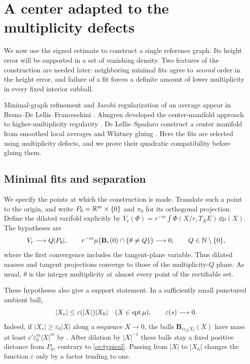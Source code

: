 \section{A center adapted to the multiplicity defects}
\label{sec:centering}

We now use the signed estimate to construct a single reference graph.  Its
height error will be supported in a set of vanishing density.  Two features
of the construction are needed later: neighboring minimal fits agree to
\emph{second} order in the height error, and failure of a fit forces a
definite amount of lower multiplicity in every fixed interior subball.

Minimal-graph refinement and Jacobi regularization of an average appear in
Brena--De Lellis--Franceschini \cite[Sections~2 and~6.3--6.4]{BDLF2025}.
Almgren developed the center-manifold approach to higher-multiplicity
regularity \cite{Almgren2000}. De Lellis--Spadaro construct a center
manifold from smoothed local averages and Whitney gluing
\cite[Sections~1 and~4]{DLS2016II}. Here the fits are selected using
multiplicity defects, and we prove their quadratic compatibility before
gluing them.

\subsection{Minimal fits and separation}

We specify the points at which the construction is made.  Translate such a
point to the origin, and write $P_0=\mathbb R^m\times\{0\}$ and $\pi_0$ for its
orthogonal projection.  Define the dilated varifold explicitly by
$V_r(\Phi)=r^{-m}\int\Phi(X/r,T_XE)\,\dd\mu(X)$.
The hypotheses are
\begin{equation}
 \label{ce:typical}
 V_r\longrightarrow Q|P_0|,
 \qquad
 r^{-m}\mu\bigl(\mathbf B_r(0)\cap\{\theta\ne Q\}\bigr)
       \longrightarrow0,
 \qquad Q\in\N\setminus\{0\},
\end{equation}
where the first convergence includes the tangent-plane variable.
Thus dilated masses and tangent projections converge to those of the
multiplicity-$Q$ plane.  As usual, $\theta$ is the integer multiplicity
at almost every point of the rectifiable set.

These hypotheses also give a support statement.  In a sufficiently small
punctured ambient ball,
\begin{equation}
 \label{ce:cone}
 |X_v|\le\varepsilon(|X|)|X_h|\quad(X\in\spt\mu),
 \qquad \varepsilon(s)\longrightarrow0.
\end{equation}
Indeed, if $|X_v|\ge\varepsilon_0|X|$ along a sequence $X\to0$, the balls
$\mathbf B_{c\varepsilon_0|X|}(X)$ have mass at least
$c'\varepsilon_0^m|X|^m$ by .  After dilation by
$|X|^{-1}$ these balls stay a fixed positive distance from $P_0$, contrary
to \eqref{ce:typical}.  Passing from $|X|$ to $|X_h|$ changes the function
$\varepsilon$ only by a factor tending to one.

